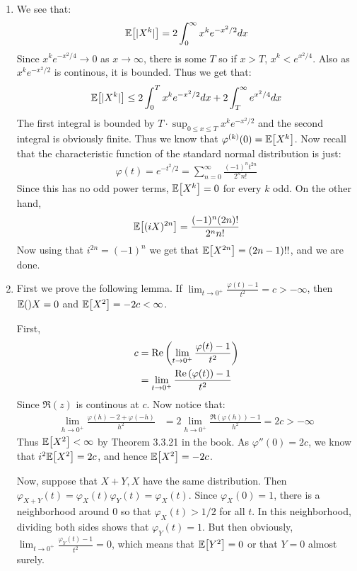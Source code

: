 \documentclass[12pt]{article}
\theoremstyle{definitionstyle}
\def\cph{\varphi}
\newcommand{\1}{\mathds 1}
\newcommand{\E}{\mathbb E \qty}
\begin{document}
\begin{enumerate}
        \item 
        We see that:
        \begin{align*}
            \E[|X^k|] = 2 \int_0^\infty x^k e^{-x^2/2}dx
        \end{align*}
        Since $x^k e^{-x^2/4} \to 0$ as $x \to \infty$, there is some $T$ so if $x > T$, $x^k < e^{x^2/4}$. Also as $x^ke^{-x^2/2}$ is continous, it is bounded. Thus we get that:
        \begin{align*}
            \E[|X^k|] \leq 2 \int_0^T x^k e^{-x^2/2}dx + 2 \int_T^\infty e^{x^2/4}dx
        \end{align*}
        The first integral is bounded by $T \cdot \sup_{0 \leq x \leq T} x^ke^{-x^2/2}$ and the second integral is obviously finite. Thus we know that $\cph^{(k)}(0) = \E[X^k]$. Now recall that the characteristic function of the standard normal distribution is just: 
        \begin{align*}
            \cph(t) = e^{-t^2/2} = \sum_{n=0}^\infty \frac{(-1)^n t^{2n}}{2^n n!}
        \end{align*}
        Since this has no odd power terms, $\E[X^k] = 0$ for every $k$ odd. On the other hand, 
        \begin{align*}
            \E[(iX)^{2n}] = \frac{(-1)^n (2n)!}{2^n n!}
        \end{align*}
        Now using that $i^{2n} = (-1)^n$ we get that $\E[X^{2n}] = (2n-1)!!$, and we are done.

        \item First we prove the following lemma. If $\lim_{t \to 0^+} \frac{\cph(t) - 1}{t^2} = c > -\infty$, then $\E X = 0$ and $\E[X^2] = -2c < \infty$.

        First,
        \begin{align*}
            c &= \Re\qty(\lim_{t \to 0^+} \frac{\cph(t) - 1}{t^2}) \\
            &= \lim_{t \to 0^+} \frac{\Re\qty(\cph(t)) - 1}{t^2}
        \end{align*}
        Since $\Re(z)$ is continous at $c$. Now notice that:
        \begin{align*}
            \lim_{h \to 0^+} \frac{\cph(h) - 2 + \cph(-h)}{h^2} &= 2\lim_{h \to 0^+} \frac{\Re(\cph(h)) - 1}{h^2} = 2c > -\infty
        \end{align*}
        Thus $\E[X^2] < \infty$ by Theorem 3.3.21 in the book. As $\cph''(0) = 2c$, we know that $i^2 \E[X^2] = 2c$, and hence $\E[X^2] = -2c$. 

        Now, suppose that $X+Y, X$ have the same distribution. Then $\cph_{X+Y}(t) = \cph_{X}(t) \cph_{Y}(t) = \cph_X(t)$. Since $\cph_X(0) = 1$, there is a neighborhood around 0 so that $\cph_X(t) > 1/2$ for all $t$. In this neighborhood, dividing both sides shows that $\cph_Y(t) = 1$. But then obviously, $\lim_{t \to 0^+} \frac{\cph_Y(t)-1}{t^2} = 0$, which means that $\E[Y^2] = 0$ or that $Y = 0$ almost surely. 


\end{enumerate}
\end{document}
